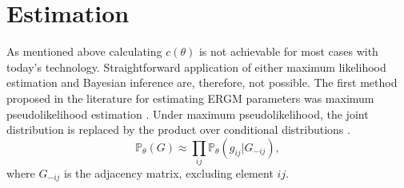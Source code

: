 \documentclass[10pt, conference, compsocconf]{IEEEtran}
\begin{document}
\section{Estimation}
\noindent As mentioned above calculating $c(\theta)$ is not achievable for most cases with today's technology.  Straightforward application of either maximum likelihood estimation and Bayesian inference are, therefore, not possible. The first method proposed in the literature for estimating ERGM parameters was maximum pseudolikelihood estimation \cite{StraussIkeda1990}. Under maximum pseudolikelihood, the joint distribution is replaced by the product over conditional distributions \cite{besag1986statistical}.  
%
\begin{equation*}
\mathbb{P}_{\theta}(G) \approx \prod_{ij} \mathbb{P}_{\theta}\left(g_{ij}|G_{-ij}\right), 
\end{equation*}
where $G_{-ij}$ is the adjacency matrix, excluding element $ij$.
\end{document}
